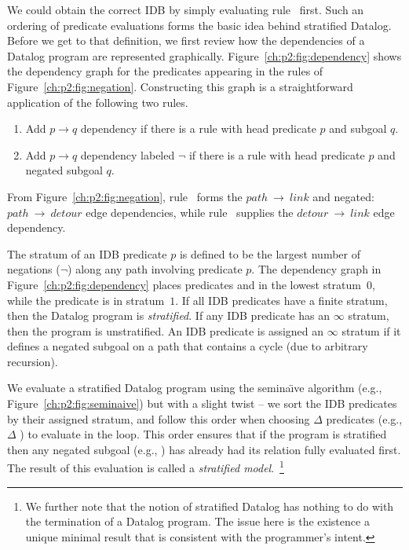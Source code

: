 We could obtain the correct IDB by simply evaluating rule~ first.  Such
an ordering of predicate evaluations forms the basic idea behind stratified
Datalog.  Before we get to that definition, we first review how the
dependencies of a Datalog program are represented graphically.
Figure~\ref{ch:p2:fig:dependency} shows the dependency graph for the
predicates appearing in the rules of Figure~\ref{ch:p2:fig:negation}.
Constructing this graph is a straightforward application of the following two
rules.
\begin{enumerate}
  \ssp
  \item Add $p \rightarrow q$ dependency if there is a rule with head predicate $p$ and subgoal $q$.
  \item Add $p \rightarrow q$ dependency labeled $\neg$ if there is a rule with head predicate $p$ and negated subgoal $q$.
\end{enumerate}
From Figure~\ref{ch:p2:fig:negation}, rule~ forms the
$path~\rightarrow~link$ and negated:~$path~\rightarrow~detour$ edge
dependencies, while rule~ supplies the $detour~\rightarrow~link$ edge
dependency.

The stratum of an IDB predicate $p$ is defined to be the largest number of
negations ($\neg$) along any path involving predicate $p$.  The dependency graph
in Figure~\ref{ch:p2:fig:dependency} places predicates  and
 in the lowest stratum~$0$, while the  predicate is in
stratum~$1$.  If all IDB predicates have a finite stratum, then the Datalog
program is {\em stratified}.  If any IDB predicate has an $\infty$ stratum,
then the program is unstratified.  An IDB predicate is assigned an $\infty$
stratum if it defines a negated subgoal on a path that contains a cycle (due
to arbitrary recursion).

We evaluate a stratified Datalog program using the semina\"{\i}ve algorithm
(e.g., Figure~\ref{ch:p2:fig:seminaive}) but with a slight twist -- we sort the
IDB predicates by their assigned stratum, and follow this order when choosing
$\Delta$ predicates (e.g., $\Delta$ ) to evaluate in the loop.  This
order ensures that if the program is stratified then any negated subgoal (e.g.,
) has already had its relation fully evaluated first.  The result of
this evaluation is called a {\em stratified model}.~\footnote{We further note
that the notion of stratified Datalog has nothing to do with the termination of
a Datalog program.  The issue here is the existence a unique minimal result
that is consistent with the programmer's intent.}

